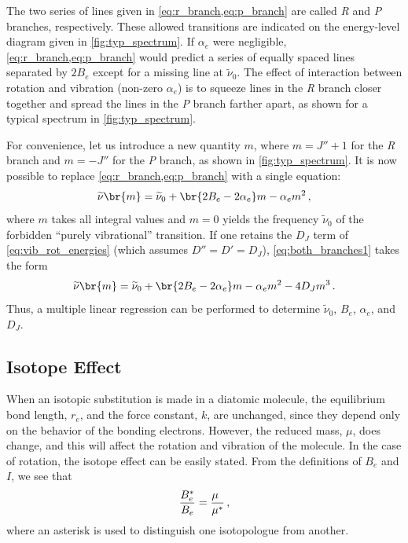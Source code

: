 The two series of lines given in \cref{eq:r_branch,eq:p_branch} are called \emph{R} and \emph{P} branches, respectively. 
These allowed transitions are indicated on the energy-level diagram given in \cref{fig:typ_spectrum}. 
If \( \alpha_e \) were negligible, \cref{eq:r_branch,eq:p_branch} would predict a series of equally spaced lines separated by \( 2 B_e \) except for a missing line at \( \widetilde{\nu}_0 \). 
The effect of interaction between rotation and vibration (non-zero \( \alpha_e \)) is to squeeze lines in the \emph{R} branch closer together and spread the lines in the \emph{P} branch farther apart, as shown for a typical spectrum in \cref{fig:typ_spectrum}. 

For convenience, let us introduce a new quantity \( m \), where \( {m = J'' + 1} \) for the \emph{R} branch and \( {m = -J''} \) for the \emph{P} branch, as shown in \cref{fig:typ_spectrum}. 
It is now possible to replace \cref{eq:r_branch,eq:p_branch} with a single equation:
\begin{equation}
	\widetilde{\nu}\br{m} = \widetilde{\nu}_0 + \br{2 B_e - 2 \alpha_e} m - \alpha_e m^2 \, ,
	\label{eq:both_branches1}
\end{equation}
where \( m \) takes all integral values and \( {m = 0} \) yields the frequency \( \widetilde{\nu}_0 \) of the forbidden ``purely vibrational'' transition. 
If one retains the \( D_J \) term of \cref{eq:vib_rot_energies} (which assumes \( {D'' = D' = D_J} \)), \cref{eq:both_branches1} takes the form
\begin{equation}
	\widetilde{\nu}\br{m} = \widetilde{\nu}_0 + \br{2 B_e - 2 \alpha_e} m - \alpha_e m^2 - 4 D_J m^3 \, .
	\label{eq:both_branches2}
\end{equation}
Thus, a multiple linear regression can be performed to determine \( \widetilde{\nu}_0 \), \( B_e \), \( \alpha_e \), and \( D_J \).


\subsection{Isotope Effect} %
\label{sub:isotope_effect}

When an isotopic substitution is made in a diatomic molecule, the equilibrium bond length, \( r_e \), and the force constant, \( k \), are unchanged, since they depend only on the behavior of the bonding electrons. 
However, the reduced mass, \( \mu \), does change, and this will affect the rotation and vibration of the molecule. 
In the case of rotation, the isotope effect can be easily stated. From the definitions of \( B_e \) and \( I \), we see that 
\begin{equation}
	\frac{B_e^*}{B_e} = \frac{\mu\hphantom{^*}}{\mu^*} \, ,
	\label{eq:eff_mass_isotope_relation}
\end{equation}
where an asterisk is used to distinguish one isotopologue from another. 

